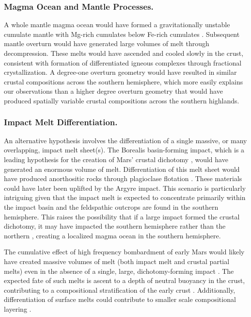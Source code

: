 \documentclass[11pt]{article}
\begin{document}
\subsubsection*{Magma Ocean and Mantle Processes.} 

A whole mantle magma ocean would have formed a gravitationally unstable cumulate mantle with Mg-rich cumulates below Fe-rich cumulates \citep{Elkins-Tanton2005}. Subsequent mantle overturn would have generated large volumes of melt through decompression. These melts would have ascended and cooled slowly in the crust, consistent with formation of differentiated igneous complexes through fractional crystallization. A degree-one overturn geometry \citep{Borg2003, Elkins-Tanton2005, Debaille2008} would have resulted in similar crustal compositions across the southern hemisphere, which more easily explains our observations than a higher degree overturn geometry \citep{Scheinberg2014} that would have produced spatially variable crustal compositions across the southern highlands.

\subsubsection*{Impact Melt Differentiation.} 

An alternative hypothesis involves the differentiation of a single massive, or many overlapping, impact melt sheet(s). The Borealis basin-forming impact, which is a leading hypothesis for the creation of Mars' crustal dichotomy \citep{Don1984, Andrews-Hanna2008, Marinova2008, Nimmo2008}, would have generated an enormous volume of melt. Differentiation of this melt sheet would have produced anorthositic rocks through plagioclase flotation \citep{Koeppel2020, Manske2021}. These materials could have later been uplifted by the Argyre impact. This scenario is particularly intriguing given that the impact melt is expected to concentrate primarily within the impact basin \citep{Marinova2008, Ballantyne2023} and the feldspathic outcrops are found in the southern hemisphere. This raises the possibility that if a large impact formed the crustal dichotomy, it may have impacted the southern hemisphere rather than the northern \citep{Reese2010, Golabek2011, Leone2014, Ballantyne2023, Cheng2024}, creating a localized magma ocean in the southern hemisphere.

The cumulative effect of high frequency bombardment of early Mars would likely have created massive volumes of melt (both impact melt and crustal partial melts) even in the absence of a single, large, dichotomy-forming impact \citep{Koeppel2020, Manske2021, Black2024}. The expected fate of such melts is ascent to a depth of neutral buoyancy in the crust, contributing to a compositional stratification of the early crust \citep{Black2024}. Additionally, differentiation of surface melts could contribute to smaller scale compositional layering \citep{Koeppel2020}.
\end{document}
